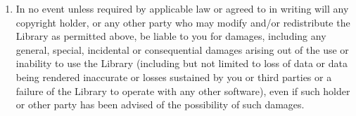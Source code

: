 {\begin{multicols}{2}
\begin{enumerate}
\item 
{\sc In no event unless required by applicable law or agreed to in writing 
will any copyright holder, or any other party who may modify and/or redistribute 
the Library as permitted above, be liable to you for damages, including any 
general, special, incidental or consequential damages arising out of the use or 
inability to use the Library (including but not limited to loss of data or data 
being rendered inaccurate or losses sustained by you or third parties or a 
failure of the Library to operate with any other software), even if such holder 
or other party has been advised of the possibility of such damages.}

\end{enumerate}
\end{multicols}
} %

\pagebreak[2]

